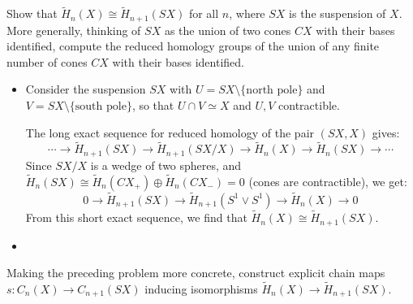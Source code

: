 \documentclass[12pt]{article}
\begin{document}
\begin{statement}
    Show that $\tilde{H}_n(X) \cong \tilde{H}_{n+1}(SX)$ for all $n$, where $SX$ is the suspension of $X$. More generally, thinking of $SX$ as the union of two cones $CX$ with their bases identified, compute the reduced homology groups of the union of any finite number of cones $CX$ with their bases identified. 
\end{statement}
\begin{newproof}
    \begin{itemize}
        \item Consider the suspension $SX$ with $U = SX \setminus \{\text{north pole}\}$ and $V = SX \setminus \{\text{south pole}\}$, so that $U \cap V \simeq X$ and $U,V$ contractible. 

        The long exact sequence for reduced homology of the pair $(SX, X)$ gives:
        $$ \cdots \to \tilde{H}_{n+1}(SX) \to \tilde{H}_{n+1}(SX/X) \to \tilde{H}_n(X) \to \tilde{H}_n(SX) \to \cdots $$
        Since $SX/X$ is a wedge of two spheres, and $\tilde{H}_n(SX) \cong \tilde{H}_n(CX_+) \oplus \tilde{H}_n(CX_-) = 0$ (cones are contractible), we get:
        $$ 0 \to \tilde{H}_{n+1}(SX) \to \tilde{H}_{n+1}(S^1 \vee S^1) \to \tilde{H}_n(X) \to 0 $$
        From this short exact sequence, we find that $\tilde{H}_n(X) \cong \tilde{H}_{n+1}(SX)$.

        \item 
\end{itemize}
\end{newproof}

\begin{statement}
    Making the preceding problem more concrete, construct explicit chain maps $s: C_n(X) \to C_{n+1}(SX)$ inducing isomorphisms $\tilde{H}_n(X) \to \tilde{H}_{n+1}(SX)$.
\end{statement}
\begin{newproof}

\end{newproof}
\end{document}
